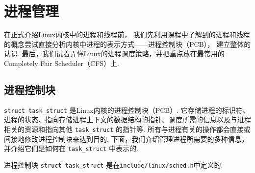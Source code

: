 \section{进程管理}
在正式介绍Linux内核中的进程和线程前，
我们先利用课程中了解到的进程和线程的概念尝试直接分析内核中进程的表示方式——进程控制块（PCB），
建立整体的认识.
最后，我们试着弄懂Linux的进程调度策略，并把重点放在最常用的
Completely Fair Scheduler（CFS）上.

\subsection{进程控制块}
\lstinline{struct task_struct}
是Linux内核的进程控制块（PCB）.
它存储进程的标识符、进程的状态、指向存储进程上下文的数据结构的指针、调度所需的信息以及与进程相关的资源和指向其他 \lstinline{task_struct} 的指针等.
所有与进程有关的操作都会直接或间接地修改进程控制块来达到目的.
下面，我们介绍管理进程所需要的多种信息，并介绍它们是如何在 \lstinline{task_struct} 中表示的.

\begin{readsrcbox}{进程控制块}
	\lstinline{struct task_struct} 是在\lstinline{include/linux/sched.h}中定义的.
\end{readsrcbox}

